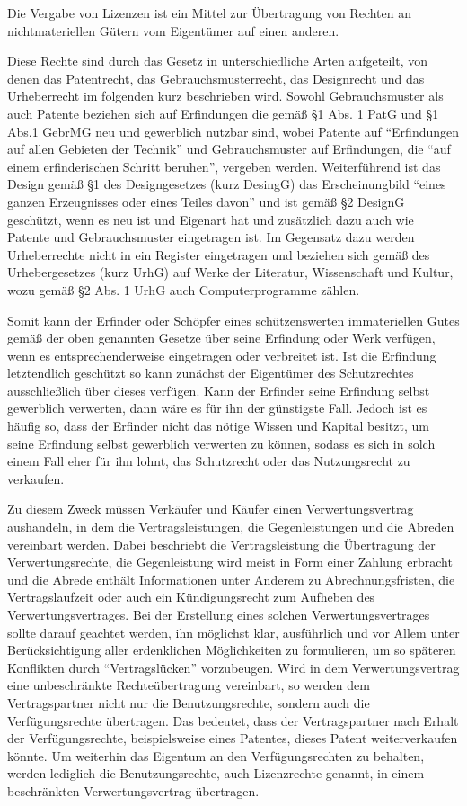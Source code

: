 Die Vergabe von Lizenzen ist ein Mittel zur Übertragung von Rechten an nichtmateriellen Gütern vom Eigentümer auf einen anderen.

Diese Rechte sind durch das Gesetz in unterschiedliche Arten aufgeteilt, von denen das Patentrecht, das Gebrauchsmusterrecht, das Designrecht und das Urheberrecht im folgenden kurz beschrieben wird.
Sowohl Gebrauchsmuster als auch Patente beziehen sich auf Erfindungen die gemäß §1 Abs. 1 PatG und §1 Abs.1 GebrMG neu und gewerblich nutzbar sind,
wobei Patente auf “Erfindungen auf allen Gebieten der Technik” und Gebrauchsmuster auf Erfindungen, die “auf einem erfinderischen Schritt beruhen”, vergeben werden.
Weiterführend ist das Design gemäß §1 des Designgesetzes (kurz DesingG) das Erscheinungbild “eines ganzen Erzeugnisses oder eines Teiles davon” und ist gemäß §2 DesignG geschützt,
wenn es neu ist und Eigenart hat und zusätzlich dazu auch wie Patente und Gebrauchsmuster eingetragen ist. Im Gegensatz dazu werden Urheberrechte nicht in ein Register eingetragen und
beziehen sich gemäß des Urhebergesetzes (kurz UrhG) auf Werke der Literatur, Wissenschaft und Kultur, wozu gemäß §2 Abs. 1 UrhG auch Computerprogramme zählen.

Somit kann der Erfinder oder Schöpfer eines schützenswerten immateriellen Gutes gemäß der oben genannten Gesetze über seine Erfindung oder Werk verfügen,
wenn es entsprechenderweise eingetragen oder verbreitet ist. Ist die Erfindung letztendlich geschützt so kann zunächst der Eigentümer des Schutzrechtes ausschließlich über dieses verfügen.
Kann der Erfinder seine Erfindung selbst gewerblich verwerten, dann wäre es für ihn der günstigste Fall. Jedoch ist es häufig so, dass der Erfinder nicht das nötige Wissen und Kapital besitzt,
um seine Erfindung selbst gewerblich verwerten zu können, sodass es sich in solch einem Fall eher für ihn lohnt, das Schutzrecht oder das Nutzungsrecht zu verkaufen.

Zu diesem Zweck müssen Verkäufer und Käufer einen Verwertungsvertrag aushandeln, in dem die Vertragsleistungen, die Gegenleistungen und die Abreden vereinbart werden.
Dabei beschriebt die Vertragsleistung die Übertragung der Verwertungsrechte, die Gegenleistung wird meist in Form einer Zahlung erbracht und die Abrede enthält Informationen unter Anderem
zu Abrechnungsfristen, die Vertragslaufzeit oder auch ein Kündigungsrecht zum Aufheben des Verwertungsvertrages. Bei der Erstellung eines solchen Verwertungsvertrages sollte darauf geachtet werden,
ihn möglichst klar, ausführlich und vor Allem unter Berücksichtigung aller erdenklichen Möglichkeiten zu formulieren, um so späteren Konflikten durch “Vertragslücken” vorzubeugen.
Wird in dem Verwertungsvertrag eine unbeschränkte Rechteübertragung vereinbart, so werden dem Vertragspartner nicht nur die Benutzungsrechte, sondern auch die Verfügungsrechte übertragen.
Das bedeutet, dass der Vertragspartner nach Erhalt der Verfügungsrechte, beispielsweise eines Patentes, dieses Patent weiterverkaufen könnte. Um weiterhin das Eigentum an den Verfügungsrechten
zu behalten, werden lediglich die Benutzungsrechte, auch Lizenzrechte genannt, in einem beschränkten Verwertungsvertrag übertragen.

